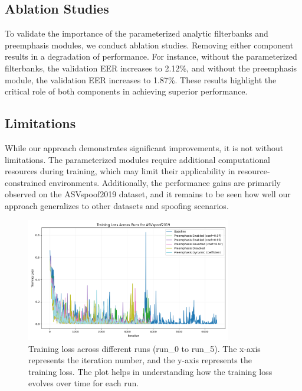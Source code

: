 \documentclass{article} %
\begin{document}
\subsection{Ablation Studies}
\label{subsec:ablation_studies}
To validate the importance of the parameterized analytic filterbanks and preemphasis modules, we conduct ablation studies. Removing either component results in a degradation of performance. For instance, without the parameterized filterbanks, the validation EER increases to 2.12\%, and without the preemphasis module, the validation EER increases to 1.87\%. These results highlight the critical role of both components in achieving superior performance.

\subsection{Limitations}
\label{subsec:limitations}
While our approach demonstrates significant improvements, it is not without limitations. The parameterized modules require additional computational resources during training, which may limit their applicability in resource-constrained environments. Additionally, the performance gains are primarily observed on the ASVspoof2019 dataset, and it remains to be seen how well our approach generalizes to other datasets and spoofing scenarios.

\begin{figure}[h]
    \centering
    \includegraphics[width=0.8\textwidth]{train_loss_ASVspoof2019_across_runs.png}
    \caption{Training loss across different runs (run\_0 to run\_5). The x-axis represents the iteration number, and the y-axis represents the training loss. The plot helps in understanding how the training loss evolves over time for each run.}
    \label{fig:train_loss}
\end{figure}
\end{document}
